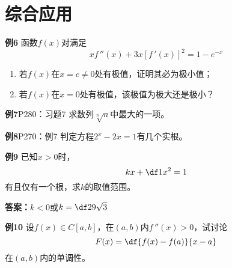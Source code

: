 \section{综合应用}

\begin{frame}
	\linespread{1.2}
	\begin{exampleblock}{{\bf 例6}\hfill}
		函数$f(x)$对满足
		$$xf\,''(x)+3x[f\,'(x)]^2=1-e^{-x}$$
		\vspace{-2em}
		\begin{enumerate}
		  \item 若$f(x)$在$x=c\ne 0$处有极值，证明其必为极小值；\pause
		  \item 若$f(x)$在$x=0$处有极值，该极值为极大还是极小？
		\end{enumerate}
	\end{exampleblock}
	\pause
	\bigskip
		\begin{exampleblock}{{\bf 例7}\hfill P280：习题7}
		求数列$\sqrt[n]n$中最大的一项。
	\end{exampleblock}
\end{frame}

\begin{frame}
	\linespread{1.2}
	\begin{exampleblock}{{\bf 例8}\hfill P270：例7}
		判定方程$2^x-2x=1$有几个实根。
	\end{exampleblock}
	\pause
	\bigskip
	\begin{exampleblock}{{\bf 例9}\hfill}
		已知$x>0$时，
		$$kx+\df1{x^2}=1$$
		有且仅有一个根，求$k$的取值范围。
	\end{exampleblock}
	\pause
	{\bf 答案：}$k<0$或$k=\df29\sqrt 3$
\end{frame}

\begin{frame}
	\linespread{1.2}
	\begin{exampleblock}{{\bf 例10}\hfill}
		设$f(x)\in C[a,b]$，在$(a,b)$内$f\,''(x)>0$，试讨论
		$$F(x)=\df{f(x)-f(a)}{x-a}$$
		在$(a,b)$内的单调性。
	\end{exampleblock}
\end{frame}


